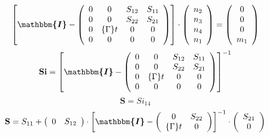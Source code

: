 \[ \left[ \boldsymbol{\mathbbm{I}}  - \left(\begin{array}{cccc} 0 & 0
& S_{12} & S_{11} \\ 0 & 0 & S_{22} & S_{21} \\ 0 & \{\Gamma\}t & 0 &
0 \\ 0 & 0 & 0 & 0 \end{array}\right)\right] \cdot
\left(\begin{array}{c} n_{2} \\ n_{3} \\ n_{4} \\ n_{1}
\end{array}\right) = \left(\begin{array}{c} 0 \\ 0 \\ 0 \\ m_{1}
\end{array}\right) \]
\[ \mathbf{Si} = \left[ \boldsymbol{\mathbbm{I}}  -
\left(\begin{array}{cccc} 0 & 0 & S_{12} & S_{11} \\ 0 & 0 & S_{22} &
S_{21} \\ 0 & \{\Gamma\}t & 0 & 0 \\ 0 & 0 & 0 & 0 \end{array}\right)
\right]^{-1} \]
\[ \mathbf{S} = Si_{14} \]
\[ \mathbf{S} = S_{11} + \left(\begin{array}{cc} 0 & S_{12}
\end{array}\right) \cdot \left[ \boldsymbol{\mathbbm{I}}  -
\left(\begin{array}{cc} 0 & S_{22} \\ \{\Gamma\}t & 0
\end{array}\right) \right]^{-1} \cdot\left(\begin{array}{c} S_{21} \\
0 \end{array}\right) \]
